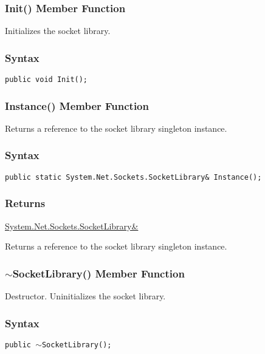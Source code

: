 \documentclass[a4paper,oneside,11.000000pt]{book}
\begin{document}
\hypertarget{System.Net.Sockets.SocketLibrary.Init.P.System.Net.Sockets.SocketLibrary}{\subsubsection*{Init() Member Function}}\begin{flushleft}
Initializes the socket library.

\end{flushleft}

\subsubsection*{Syntax}\texttt{public void Init();}
\clearpage

\hypertarget{System.Net.Sockets.SocketLibrary.Instance}{\subsubsection*{Instance() Member Function}}
\begin{flushleft}
Returns a reference to the socket library singleton instance.

\end{flushleft}
\subsubsection*{Syntax}
\texttt{public static System.Net.Sockets.SocketLibrary\& Instance();}
\subsubsection*{Returns}
\hyperlink{System.Net.Sockets.SocketLibrary}{System.\-Net.\-Sockets.\-SocketLibrary\&\-}
\begin{flushleft}
Returns a reference to the socket library singleton instance.

\end{flushleft}
\clearpage

\hypertarget{System.Net.Sockets.SocketLibrary.destructor.P.System.Net.Sockets.SocketLibrary}{\subsubsection*{$\sim$SocketLibrary() Member Function}}
\begin{flushleft}
Destructor. Uninitializes the socket library.

\end{flushleft}
\subsubsection*{Syntax}\texttt{public $\sim$SocketLibrary();}
\clearpage
\end{document}
